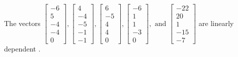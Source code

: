 \begin{exercise}
\begin{exerciseStatement}
  \end{exerciseStatement}
  \begin{exerciseAnswer}
   The vectors \(\left[\begin{array}{r}
-6 \\
5 \\
-4 \\
-4 \\
0
\end{array}\right] , \left[\begin{array}{r}
4 \\
-4 \\
-5 \\
-1 \\
-1
\end{array}\right] , \left[\begin{array}{r}
6 \\
-5 \\
4 \\
4 \\
0
\end{array}\right] , \left[\begin{array}{r}
-6 \\
1 \\
1 \\
-3 \\
0
\end{array}\right] , \text{ and } \left[\begin{array}{r}
-22 \\
20 \\
1 \\
-15 \\
-7
\end{array}\right]\) are 
  	 linearly dependent  .
  


  \end{exerciseAnswer}
\end{exercise}